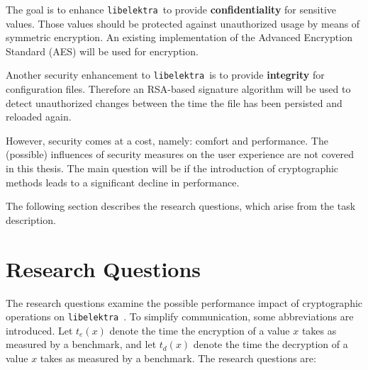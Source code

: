 \documentclass[a4paper,12pt]{article}
\newcommand{\libelektra}{\texttt{libelektra}~}
\begin{document}
The goal is to enhance \libelektra to provide \textbf{confidentiality} for sensitive values.
Those values should be protected against unauthorized usage by means of symmetric encryption.
An existing implementation of the Advanced Encryption Standard (AES) will be used for encryption.

Another security enhancement to \libelektra is to provide \textbf{integrity} for configuration files.
Therefore an RSA-based signature algorithm will be used to detect unauthorized changes between the time the file has been persisted and reloaded again.

However, security comes at a cost, namely: comfort and performance. The (possible) influences of security measures on the user experience are not covered in this thesis. The main question will be if the introduction of cryptographic methods leads to a significant decline in performance.

The following section describes the research questions, which arise from the task description.


\section{Research Questions}

The research questions examine the possible performance impact of cryptographic operations on \libelektra.
To simplify communication, some abbreviations are introduced. 
Let $t_e(x)$ denote the time the encryption of a value $x$ takes as measured by a benchmark, and let $t_d(x)$ denote the time the decryption of a value $x$ takes as measured by a benchmark.
The research questions are:
\end{document}
